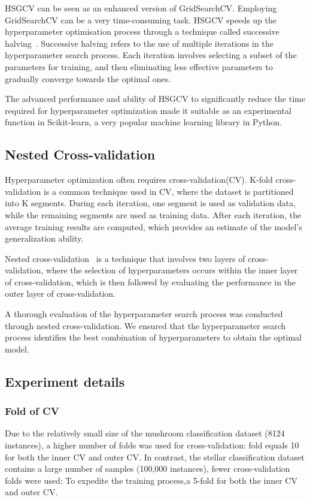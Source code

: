 \documentclass[runningheads,a4paper]{llncs}
\begin{document}
HSGCV can be seen as an enhanced version of GridSearchCV. Employing GridSearchCV can be a very time-consuming task. HSGCV speeds up the hyperparameter optimisation process through a technique called successive halving~\cite{pmlr-v51-jamieson16}.
Successive halving refers to the use of multiple iterations in the hyperparameter search process. Each iteration involves selecting a subset of the parameters for training, and then eliminating less effective parameters to gradually converge towards the optimal ones.

The advanced performance and ability of HSGCV to significantly reduce the time required for hyperparameter optimization made it suitable as an experimental function in Scikit-learn\cite{pedregosa2011scikit}, a very popular machine learning library in Python.

\subsection{Nested Cross-validation}
Hyperparameter optimization often requires cross-validation(CV). K-fold cross-validation is a common technique used in CV, where the dataset is partitioned into K segments. During each iteration, one segment is used as validation data, while the remaining segments are used as training data. After each iteration, the average training results are computed, which provides an estimate of the model's generalization ability.

Nested cross-validation~\cite{https://doi.org/10.1111/j.2517-6161.1974.tb00994.x} is a technique that involves two layers of cross-validation, where the selection of hyperparameters occurs within the inner layer of cross-validation, which is then followed by evaluating the performance in the outer layer of cross-validation.

A thorough evaluation of the hyperparameter search process was conducted through nested cross-validation. We ensured that the hyperparameter search process identifies the best combination of hyperparameters to obtain the optimal model.

\subsection{Experiment details}

\subsubsection{Fold of CV}
Due to the relatively small size of the mushroom classification dataset (8124 instances), a higher number of folds was used for cross-validation: fold equals 10  for both the inner CV and outer CV. In contrast, the stellar classification dataset contains a large number of samples (100,000 instances), fewer cross-validation folds were used: To expedite the training process,a 5-fold for both the inner CV and outer CV.
\end{document}
